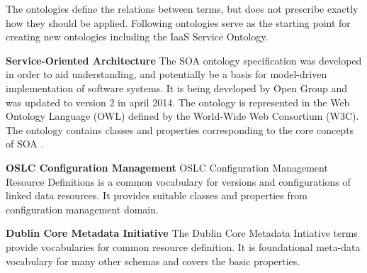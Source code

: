 The ontologies define the relations between terms, but does not prescribe exactly how they should be applied. Following ontologies serve as the starting point for creating new ontologies including the IaaS Service Ontology.

\textbf{Service-Oriented Architecture}
The SOA ontology specification was developed in order to aid understanding, and potentially be a basis for model-driven implementation of software systems. It is being developed by Open Group and was updated to version 2 in april 2014. The ontology is represented in the Web Ontology Language (OWL) defined by the World-Wide Web Consortium (W3C). The ontology contains classes and properties corresponding to the core concepts of SOA \cite{SOAOntology}.


\textbf{OSLC Configuration Management}
OSLC Configuration Management Resource Definitions \cite{OasisCM} is a common vocabulary for versions and configurations of linked data resources. It provides suitable classes and properties from configuration management domain.

\textbf{Dublin Core Metadata Initiative}
The Dublin Core Metadata Intiative terms provide vocabularies for common resource definition. It is foundational meta-data vocabulary for many other schemas and covers the basic properties.



